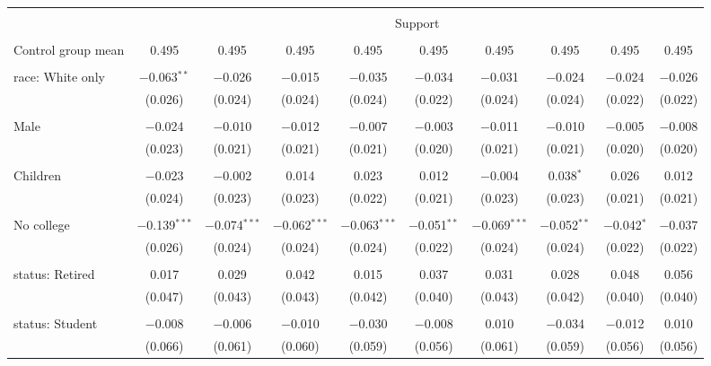 
\begin{tabular}{@{\extracolsep{5pt}}lccccccccc} 
\\[-1.8ex]\hline 
\hline \\[-1.8ex] 
 & \multicolumn{9}{c}{Support} \\ 
\cline{2-10} 
\hline \\[-1.8ex] 
 Control group mean & 0.495 & 0.495 & 0.495 & 0.495 & 0.495 & 0.495 & 0.495 & 0.495 & 0.495  \\ \hline \\[-1.8ex] race: White only & $-$0.063$^{**}$ & $-$0.026 & $-$0.015 & $-$0.035 & $-$0.034 & $-$0.031 & $-$0.024 & $-$0.024 & $-$0.026 \\ 
  & (0.026) & (0.024) & (0.024) & (0.024) & (0.022) & (0.024) & (0.024) & (0.022) & (0.022) \\ 
  & & & & & & & & & \\ 
 Male & $-$0.024 & $-$0.010 & $-$0.012 & $-$0.007 & $-$0.003 & $-$0.011 & $-$0.010 & $-$0.005 & $-$0.008 \\ 
  & (0.023) & (0.021) & (0.021) & (0.021) & (0.020) & (0.021) & (0.021) & (0.020) & (0.020) \\ 
  & & & & & & & & & \\ 
 Children & $-$0.023 & $-$0.002 & 0.014 & 0.023 & 0.012 & $-$0.004 & 0.038$^{*}$ & 0.026 & 0.012 \\ 
  & (0.024) & (0.023) & (0.023) & (0.022) & (0.021) & (0.023) & (0.023) & (0.021) & (0.021) \\ 
  & & & & & & & & & \\ 
 No college & $-$0.139$^{***}$ & $-$0.074$^{***}$ & $-$0.062$^{***}$ & $-$0.063$^{***}$ & $-$0.051$^{**}$ & $-$0.069$^{***}$ & $-$0.052$^{**}$ & $-$0.042$^{*}$ & $-$0.037 \\ 
  & (0.026) & (0.024) & (0.024) & (0.024) & (0.022) & (0.024) & (0.024) & (0.022) & (0.022) \\ 
  & & & & & & & & & \\ 
 status: Retired & 0.017 & 0.029 & 0.042 & 0.015 & 0.037 & 0.031 & 0.028 & 0.048 & 0.056 \\ 
  & (0.047) & (0.043) & (0.043) & (0.042) & (0.040) & (0.043) & (0.042) & (0.040) & (0.040) \\ 
  & & & & & & & & & \\ 
 status: Student & $-$0.008 & $-$0.006 & $-$0.010 & $-$0.030 & $-$0.008 & 0.010 & $-$0.034 & $-$0.012 & 0.010 \\ 
  & (0.066) & (0.061) & (0.060) & (0.059) & (0.056) & (0.061) & (0.059) & (0.056) & (0.056) \\ 

\end{tabular}
